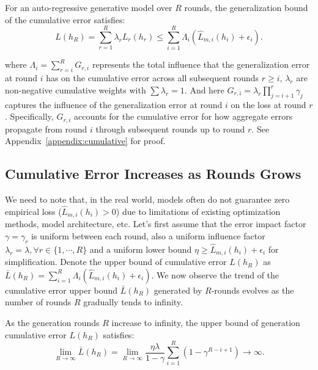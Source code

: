\begin{theorem}\label{cumulative}
For an auto-regressive generative model over \(R\) rounds, the generalization bound of the cumulative error satisfies:
   \[ L(h_R) = \sum_{r=1}^{R}\lambda_r L_{r}(h_{r}) \leq \sum_{i=1}^R \Lambda_i \left( \hat{L}_{m,i}(h_{i}) + \epsilon_i \right).\]
\end{theorem}
where \( \Lambda_i = \sum_{r=i}^R G_{r,i} \) represents the total influence that the generalization error at round \( i \) has on the cumulative error across all subsequent rounds \( r \geq i \), \(\lambda_r\) are non-negative cumulative weights with \(\sum\lambda_r=1\). And here \(
  G_{r,i} = \lambda_r \prod_{j=i+1}^{r} \gamma_j
  \) captures the influence of the generalization error at round \( i \) on the loss at round \( r \). Specifically, \(G_{r,i}\) accounts for the cumulative error for how aggregate errors propagate from round \( i \) through subsequent rounds up to round \( r \). See Appendix~\ref{appendix:cumulative} for proof.
\vspace{-1mm}
\subsection{Cumulative Error Increases as Rounds Grows}

We need to note that, in the real world, models often do not guarantee zero empirical loss (\(\hat{L}_{m,i}(h_{i}) > 0\)) due to limitations of existing optimization methods, model architecture, etc. Let's first assume that the error impact factor \(\gamma = \gamma_r\) is uniform between each round, also a uniform influence factor \(\lambda_r = \lambda, \forall r \in \{1,\cdots, R\}\) and a uniform lower bound \(\eta \geq  \hat{L}_{m,i}(h_{i}) + \epsilon_i \) for simplification. Denote the upper bound of cumulative error \(L(h_R)\) as \( \bar L(h_R) = \sum_{i=1}^R \Lambda_i \left( \hat{L}_{m,i}(h_{i}) + \epsilon_i \right)\). We now observe the trend of the cumulative error upper bound \( \bar L(h_R)\) generated by \(R\)-rounds evolves as the number of rounds \(R\) gradually tends to infinity.

\begin{theorem}\label{divergence}
As the generation rounds \(R\) increase to infinity, the upper bound of generation cumulative error \(L(h_R)\) satisfies:
    \[
\lim_{R \to \infty} \bar L(h_R) =\lim_{R \to \infty} \frac{\eta \lambda}{1 - \gamma} \sum_{i=1}^R \left( 1 - \gamma^{R - i + 1} \right) \to \infty.
\]
\end{theorem}

